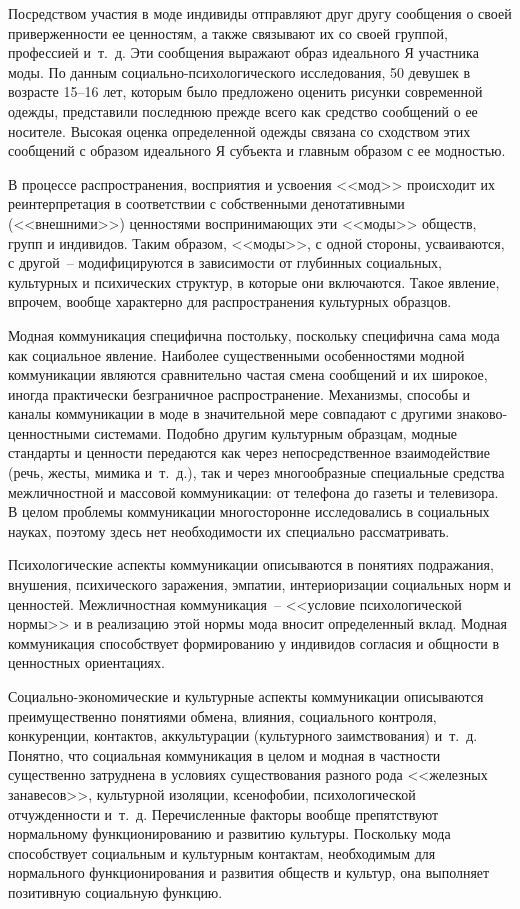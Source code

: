   Посредством участия в моде индивиды отправляют друг другу сообщения о своей
  приверженности ее ценностям, а также связывают их со своей группой, профессией
  и~т.~д. Эти сообщения выражают образ идеального Я участника моды. По данным
  социально-психологического исследования, 50 девушек в возрасте 15--16 лет,
  которым было предложено оценить рисунки современной одежды, представили
  последнюю прежде всего как средство сообщений о ее носителе. Высокая оценка
  определенной одежды связана со сходством этих сообщений с образом идеального Я
  субъекта и главным образом с ее модностью.
  
  В процессе распространения, восприятия и усвоения <<мод>> происходит их
  реинтерпретация в соответствии с собственными денотативными (<<внешними>>)
  ценностями воспринимающих эти <<моды>> обществ, групп и индивидов. Таким
  образом, <<моды>>, с одной стороны, усваиваются, с другой~-- модифицируются в
  зависимости от глубинных социальных, культурных и психических структур, в
  которые они включаются. Такое явление, впрочем, вообще характерно для
  распространения культурных образцов.
  
  Модная коммуникация специфична постольку, поскольку специфична сама мода как
  социальное явление. Наиболее существенными особенностями модной коммуникации
  являются сравнительно частая смена сообщений и их широкое, иногда практически
  безграничное распространение. Механизмы, способы и каналы коммуникации в моде
  в значительной мере совпадают с другими знаково-ценностными системами. Подобно
  другим культурным образцам, модные стандарты и ценности передаются как через
  непосредственное взаимодействие (речь, жесты, мимика и~т.~д.), так и через
  многообразные специальные средства межличностной и массовой коммуникации: от
  телефона до газеты и телевизора. В целом проблемы коммуникации многосторонне
  исследовались в социальных науках, поэтому здесь нет необходимости их
  специально рассматривать.
  
  Психологические аспекты коммуникации описываются в понятиях подражания,
  внушения, психического заражения, эмпатии, интериоризации социальных норм и
  ценностей. Межличностная коммуникация~-- <<условие психологической нормы>> и в
  реализацию этой нормы мода вносит определенный вклад. Модная коммуникация
  способствует формированию у индивидов согласия и общности в ценностных
  ориентациях.
  
  Социально-экономические и культурные аспекты коммуникации описываются
  преимущественно понятиями обмена, влияния, социального контроля, конкуренции,
  контактов, аккультурации (культурного заимствования) и~т.~д. Понятно, что
  социальная коммуникация в целом и модная в частности существенно затруднена в
  условиях существования разного рода <<железных занавесов>>, культурной
  изоляции, ксенофобии, психологической отчужденности и~т.~д. Перечисленные
  факторы вообще препятствуют нормальному функционированию и развитию культуры.
  Поскольку мода способствует социальным и культурным контактам, необходимым для
  нормального функционирования и развития обществ и культур, она выполняет
  позитивную социальную функцию.
  
